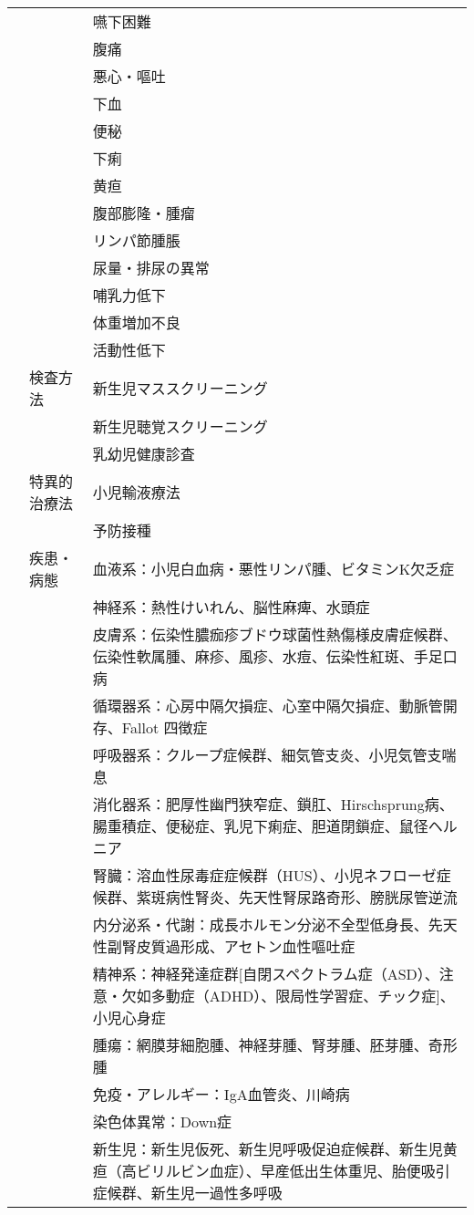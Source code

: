 \begin{xltabular}{\linewidth}{XXX}
 &  & 嚥下困難 \\
 &  & 腹痛 \\
 &  & 悪心・嘔吐 \\
 &  & 下血 \\
 &  & 便秘 \\
 &  & 下痢 \\
 &  & 黄疸 \\
 &  & 腹部膨隆・腫瘤 \\
 &  & リンパ節腫脹 \\
 &  & 尿量・排尿の異常 \\
 &  & 哺乳力低下 \\
 &  & 体重増加不良 \\
 &  & 活動性低下 \\
 & 検査方法 & 新生児マススクリーニング \\
 &  & 新生児聴覚スクリーニング \\
 &  & 乳幼児健康診査 \\
 & 特異的治療法 & 小児輸液療法 \\
 &  & 予防接種 \\
 & 疾患・病態 & 血液系：小児白血病・悪性リンパ腫、ビタミンK欠乏症 \\
 &  & 神経系：熱性けいれん、脳性麻痺、水頭症 \\
 &  & 皮膚系：伝染性膿痂疹ブドウ球菌性熱傷様皮膚症候群、伝染性軟属腫、麻疹、風疹、水痘、伝染性紅斑、手足口病 \\
 &  & 循環器系：心房中隔欠損症、心室中隔欠損症、動脈管開存、Fallot 四徴症 \\
 &  & 呼吸器系：クループ症候群、細気管支炎、小児気管支喘息 \\
 &  & 消化器系：肥厚性幽門狭窄症、鎖肛、Hirschsprung病、腸重積症、便秘症、乳児下痢症、胆道閉鎖症、鼠径ヘルニア \\
 &  & 腎臓：溶血性尿毒症症候群（HUS）、小児ネフローゼ症候群、紫斑病性腎炎、先天性腎尿路奇形、膀胱尿管逆流 \\
 &  & 内分泌系・代謝：成長ホルモン分泌不全型低身長、先天性副腎皮質過形成、アセトン血性嘔吐症 \\
 &  & 精神系：神経発達症群[自閉スペクトラム症（ASD）、注意・欠如多動症（ADHD）、限局性学習症、チック症]、小児心身症 \\
 &  & 腫瘍：網膜芽細胞腫、神経芽腫、腎芽腫、胚芽腫、奇形腫 \\
 &  & 免疫・アレルギー：IgA血管炎、川崎病 \\
 &  & 染色体異常：Down症 \\
 &  & 新生児：新生児仮死、新生児呼吸促迫症候群、新生児黄疸（高ビリルビン血症）、早産低出生体重児、胎便吸引症候群、新生児一過性多呼吸 \\

\end{xltabular}
